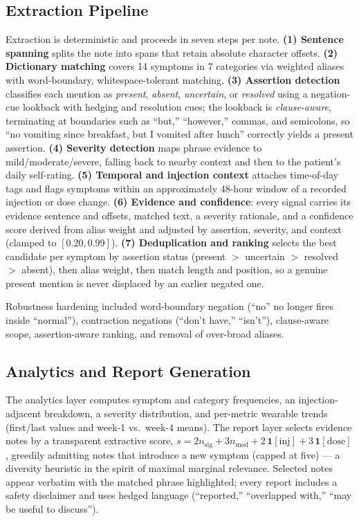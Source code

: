 \documentclass[10pt,twocolumn]{article}
\begin{document}
\subsection{Extraction Pipeline}
Extraction is deterministic and proceeds in seven steps per note. \textbf{(1) Sentence spanning} splits the note into spans that retain absolute character offsets. \textbf{(2) Dictionary matching} covers 14 symptoms in 7 categories via weighted aliases with word-boundary, whitespace-tolerant matching. \textbf{(3) Assertion detection} classifies each mention as \emph{present}, \emph{absent}, \emph{uncertain}, or \emph{resolved} using a negation-cue lookback with hedging and resolution cues; the lookback is \emph{clause-aware}, terminating at boundaries such as ``but,'' ``however,'' commas, and semicolons, so ``no vomiting since breakfast, but I vomited after lunch'' correctly yields a present assertion. \textbf{(4) Severity detection} maps phrase evidence to mild/moderate/severe, falling back to nearby context and then to the patient's daily self-rating. \textbf{(5) Temporal and injection context} attaches time-of-day tags and flags symptoms within an approximately 48-hour window of a recorded injection or dose change. \textbf{(6) Evidence and confidence}: every signal carries its evidence sentence and offsets, matched text, a severity rationale, and a confidence score derived from alias weight and adjusted by assertion, severity, and context (clamped to $[0.20, 0.99]$). \textbf{(7) Deduplication and ranking} selects the best candidate per symptom by assertion status (present $>$ uncertain $>$ resolved $>$ absent), then alias weight, then match length and position, so a genuine present mention is never displaced by an earlier negated one.

Robustness hardening included word-boundary negation (``no'' no longer fires inside ``normal''), contraction negations (``don't have,'' ``isn't''), clause-aware scope, assertion-aware ranking, and removal of over-broad aliases.

\subsection{Analytics and Report Generation}
The analytics layer computes symptom and category frequencies, an injection-adjacent breakdown, a severity distribution, and per-metric wearable trends (first/last values and week-1 vs.\ week-4 means). The report layer selects evidence notes by a transparent extractive score,
$s = 2n_{\mathrm{sig}} + 3n_{\mathrm{mod}} + 2\,\mathbf{1}[\mathrm{inj}] + 3\,\mathbf{1}[\mathrm{dose}]$,
greedily admitting notes that introduce a new symptom (capped at five) --- a diversity heuristic in the spirit of maximal marginal relevance. Selected notes appear verbatim with the matched phrase highlighted; every report includes a safety disclaimer and uses hedged language (``reported,'' ``overlapped with,'' ``may be useful to discuss'').
\end{document}
